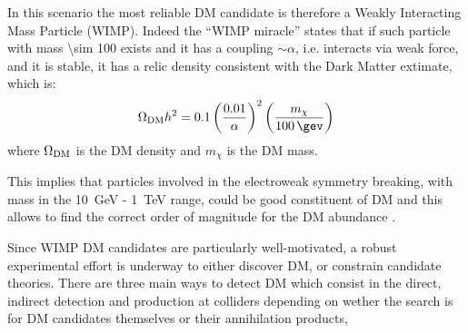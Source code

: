 In this scenario the most reliable DM candidate is therefore a Weakly Interacting Mass Particle (WIMP). Indeed the ``WIMP miracle'' states that if such particle with mass \SI{\sim 100}{\gev} exists and it has a coupling $\sim \alpha$, i.e. interacts via weak force, and it is stable, it has a relic density consistent with the Dark Matter extimate, which is:
\begin{equation}
	\Omega_\textup{DM}h^2=0.1\left(\frac{0.01}{\alpha}\right)^2\left(\frac{m_\chi}{\SI{100}{\gev}}\right)
\end{equation}
where $\Omega_\textup{DM}$ is the DM density and $m_\chi$ is the DM mass.

This implies that particles involved in the electroweak symmetry breaking, with mass in the \SI{10}{\GeV} - \SI{1}{\TeV} range, could be good constituent of DM and this allows to find the correct order of magnitude for the DM abundance \cite{DMcollider}.





Since WIMP DM candidates are particularly well-motivated, a robust experimental effort is underway to either discover DM, or constrain candidate theories. There are three main ways to detect DM which consist in the direct, indirect detection and production at colliders depending on wether the search is for DM candidates themselves or their annihilation products,

